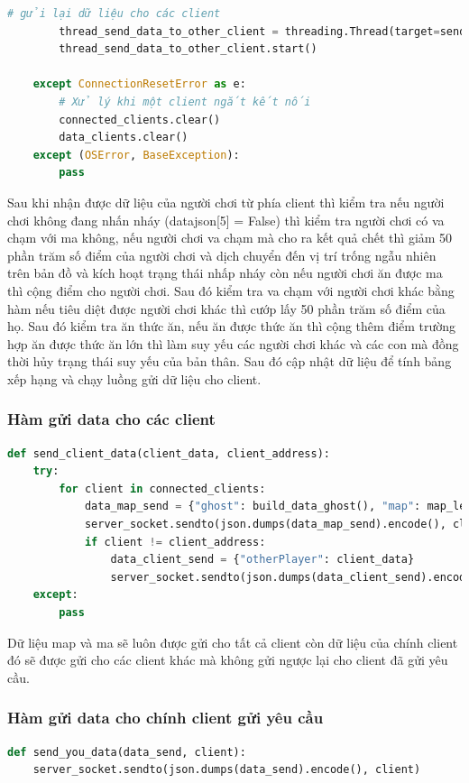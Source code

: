 \documentclass[a4paper]{article}
\begin{document}
\begin{lstlisting}[language=Python]
        # gửi lại dữ liệu cho các client
        thread_send_data_to_other_client = threading.Thread(target=send_client_data, args=(data_json, client_address,))
        thread_send_data_to_other_client.start()

    except ConnectionResetError as e:
        # Xử lý khi một client ngắt kết nối
        connected_clients.clear()
        data_clients.clear()
    except (OSError, BaseException):
        pass
\end{lstlisting}
Sau khi nhận được dữ liệu của người chơi từ phía client thì kiểm tra nếu người chơi không đang nhấn nháy (datajson[5] = False) thì kiểm tra người chơi có va chạm với ma không, nếu người chơi va chạm mà cho ra kết quả chết thì giảm 50 phần trăm số điểm của người chơi và dịch chuyển đến vị trí trống ngẫu nhiên trên bản đồ và kích hoạt trạng thái nhấp nháy còn nếu người chơi ăn được ma thì cộng điểm cho người chơi. Sau đó kiểm tra va chạm với người chơi khác bằng hàm nếu tiêu diệt được người chơi khác thì cướp lấy 50 phần trăm số điểm của họ. Sau đó kiểm tra ăn thức ăn, nếu ăn được thức ăn thì cộng thêm điểm trường hợp ăn được thức ăn lớn thì làm suy yếu các người chơi khác và các con mà đồng thời hủy trạng thái suy yếu của bản thân. Sau đó cập nhật dữ liệu để tính bảng xếp hạng và chạy luồng gửi dữ liệu cho client. 

\subsubsection{Hàm gửi data cho các client}
\begin{lstlisting}[language=Python]
def send_client_data(client_data, client_address):
    try:
        for client in connected_clients:
            data_map_send = {"ghost": build_data_ghost(), "map": map_level}
            server_socket.sendto(json.dumps(data_map_send).encode(), client)
            if client != client_address:
                data_client_send = {"otherPlayer": client_data}
                server_socket.sendto(json.dumps(data_client_send).encode(), client)
    except:
        pass
\end{lstlisting}
Dữ liệu map và ma sẽ luôn được gửi cho tất cả client còn dữ liệu của chính client đó sẽ được gửi cho các client khác mà không gửi ngược lại cho client đã gửi yêu cầu.

\subsubsection{Hàm gửi data cho chính client gửi yêu cầu}
\begin{lstlisting}[language=Python]
def send_you_data(data_send, client):
    server_socket.sendto(json.dumps(data_send).encode(), client)
\end{lstlisting}
\end{document}
